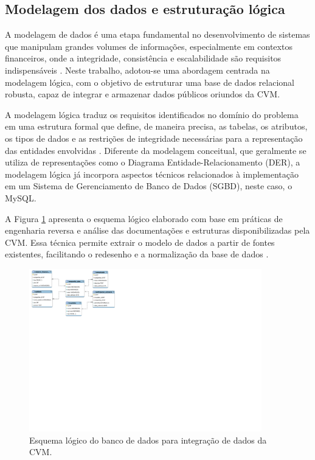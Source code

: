 \documentclass[recuosum=1.5cm]{iftex2024}
\begin{document}
\subsection{Modelagem dos dados e estruturação lógica}

A modelagem de dados é uma etapa fundamental no desenvolvimento de sistemas que manipulam grandes volumes de informações, especialmente em contextos financeiros, onde a integridade, consistência e escalabilidade são requisitos indispensáveis \cite{elmasri:2005:sistemas}. Neste trabalho, adotou-se uma abordagem centrada na modelagem lógica, com o objetivo de estruturar uma base de dados relacional robusta, capaz de integrar e armazenar dados públicos oriundos da CVM.

A modelagem lógica traduz os requisitos identificados no domínio do problema em uma estrutura formal que define, de maneira precisa, as tabelas, os atributos, os tipos de dados e as restrições de integridade necessárias para a representação das entidades envolvidas \cite{connolly:2015:database}. Diferente da modelagem conceitual, que geralmente se utiliza de representações como o Diagrama Entidade-Relacionamento (DER), a modelagem lógica já incorpora aspectos técnicos relacionados à implementação em um Sistema de Gerenciamento de Banco de Dados (SGBD), neste caso, o MySQL.

A Figura \ref{fig:esquema_logico} apresenta o esquema lógico elaborado com base em práticas de engenharia reversa e análise das documentações e estruturas disponibilizadas pela CVM. Essa técnica permite extrair o modelo de dados a partir de fontes existentes, facilitando o redesenho e a normalização da base de dados \cite{scannapieco:2006:data}.

\begin{figure}[!htb] 
	\centering
	\caption{Esquema lógico do banco de dados para integração de dados da CVM.} 
	\label{fig:esquema_logico}
	\includegraphics[width=0.9\textwidth]{figuras/esquema_logico.pdf}
	\vspace{1mm}
	\parbox[c]{0.9\textwidth}{\raggedright {}}
\end{figure}
\end{document}
